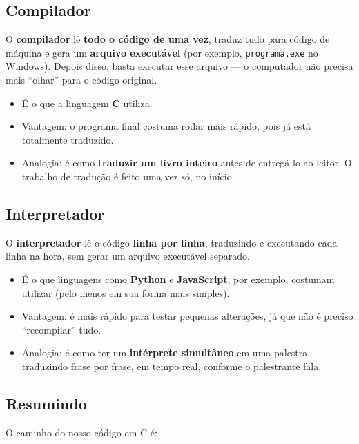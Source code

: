 \subsection*{\textcolor{verdeC}{Compilador}}

O \textbf{compilador} lê \textbf{todo o código de uma vez}, traduz tudo para código de máquina e gera um \textbf{arquivo executável} (por exemplo, \texttt{programa.exe} no Windows). Depois disso, basta executar esse arquivo --- o computador não precisa mais ``olhar'' para o código original.

\begin{itemize}
    \item É o que a linguagem \textbf{C} utiliza.
    \item \textcolor{verdeC}{Vantagem}: o programa final costuma rodar mais rápido, pois já está totalmente traduzido.
    \item \textcolor{laranja}{Analogia}: é como \textbf{traduzir um livro inteiro} antes de entregá-lo ao leitor. O trabalho de tradução é feito uma vez só, no início.
\end{itemize}

\subsection*{\textcolor{verdeC}{Interpretador}}

O \textbf{interpretador} lê o código \textbf{linha por linha}, traduzindo e executando cada linha na hora, sem gerar um arquivo executável separado.

\begin{itemize}
    \item É o que linguagens como \textbf{Python} e \textbf{JavaScript}, por exemplo, costumam utilizar (pelo menos em sua forma mais simples).
    \item \textcolor{verdeC}{Vantagem}: é mais rápido para testar pequenas alterações, já que não é preciso ``recompilar'' tudo.
    \item \textcolor{laranja}{Analogia}: é como ter um \textbf{intérprete simultâneo} em uma palestra, traduzindo frase por frase, em tempo real, conforme o palestrante fala.
\end{itemize}

\subsection*{\textcolor{verdeC}{Resumindo}}

O caminho do nosso código em C é:

